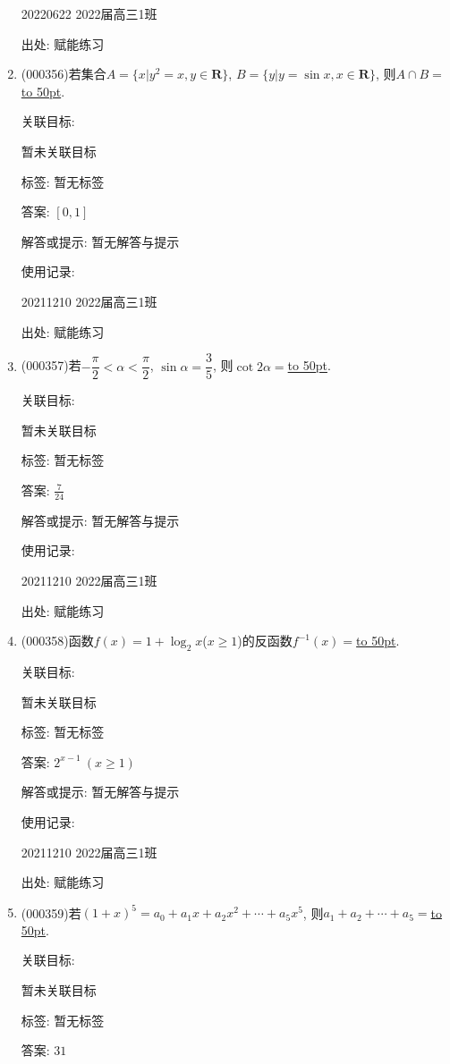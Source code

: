 \documentclass[10pt,a4paper]{article}
\newcommand{\blank}[1]{\underline{\hbox to #1pt{}}}
\begin{document}
\begin{enumerate}[1.]
20220622	2022届高三1班  	


出处: 赋能练习
\item { (000356)}若集合$A=\{x|y^2=x,y\in \mathbf{R}\}$, $B=\{y|y=\sin x,x\in \mathbf{R}\}$, 则$A\cap B=$\blank{50}.


关联目标:

暂未关联目标



标签: 暂无标签

答案: $[0,1]$

解答或提示: 暂无解答与提示

使用记录:

20211210	2022届高三1班	


出处: 赋能练习
\item { (000357)}若$-\dfrac{\pi}{2}<\alpha <\dfrac{\pi}{2}$, $\sin \alpha =\dfrac{3}{5}$, 则$\cot 2\alpha =$\blank{50}.


关联目标:

暂未关联目标



标签: 暂无标签

答案: $\frac 7{24}$

解答或提示: 暂无解答与提示

使用记录:

20211210	2022届高三1班	


出处: 赋能练习
\item { (000358)}函数$f(x)=1+\log_2 x$($x\ge 1$)的反函数$f^{-1}(x)=$\blank{50}.


关联目标:

暂未关联目标



标签: 暂无标签

答案: $2^{x-1}\ (x\ge 1)$

解答或提示: 暂无解答与提示

使用记录:

20211210	2022届高三1班	


出处: 赋能练习
\item { (000359)}若$(1+x)^5=a_0+a_1x+a_2x^2+\cdots+a_5x^5$, 则$a_1+a_2+\cdots+a_5=$\blank{50}.


关联目标:

暂未关联目标



标签: 暂无标签

答案: $31$


\end{enumerate}
\end{document}
